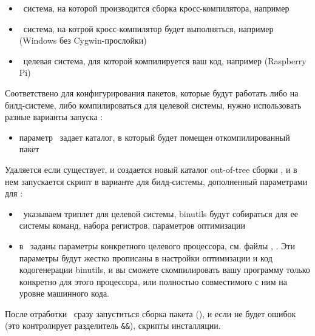 \begin{itemize}
  \item {}\ система, на которой производится сборка кросс-компилятора,
  например  
  \item {}\ система, на котрой кросс-компилятор будет выполняться,
  например  (Windows без Cygwin-прослойки)
  \item {}\ целевая система, для которой компилируется ваш код,
  например  (Raspberry Pi)
\end{itemize}

Соответствено для конфигурирования пакетов, которые будут работать либо на
билд-системе, либо компилироваться для целевой системы, нужно использовать
разные варианты запуска :



\begin{itemize}
  \item параметр \ задает каталог, в который будет помещен
  откомпилированный пакет
\end{itemize}




Удаляется если существует, и создается новый каталог out-of-tree сборки
, и в нем запускается скрипт 
в варианте для билд-системы, дополненный параметрами для :

\begin{itemize}
  \item {}\ указываем триплет для целевой системы, binutils будут
  собираться для ее системы команд, набора регистров, параметров оптимизации
  \item в \ заданы параметры конкретного целевого процессора, см.
   файлы , . Эти параметры будут жестко
   прописаны в настройки оптимизации и код кодогенерации binutils, и вы сможете
   скомпилировать вашу программу только конкретно для этого процессора, или
   полностью совместимого с ним на уровне машинного кода.
\end{itemize}

После отработки \ сразу запуститься сборка пакета (),
и если не будет ошибок (это контролирует разделитель \verb|&&|), скрипты
инсталляции.

